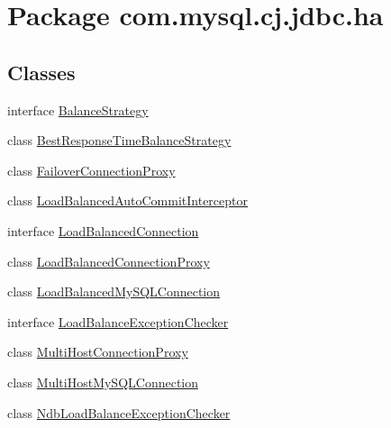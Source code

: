 \hypertarget{namespacecom_1_1mysql_1_1cj_1_1jdbc_1_1ha}{}\section{Package com.\+mysql.\+cj.\+jdbc.\+ha}
\label{namespacecom_1_1mysql_1_1cj_1_1jdbc_1_1ha}
\subsection*{Classes}
\begin{DoxyCompactItemize}
\item 
interface \mbox{\hyperlink{interfacecom_1_1mysql_1_1cj_1_1jdbc_1_1ha_1_1_balance_strategy}{Balance\+Strategy}}
\item 
class \mbox{\hyperlink{classcom_1_1mysql_1_1cj_1_1jdbc_1_1ha_1_1_best_response_time_balance_strategy}{Best\+Response\+Time\+Balance\+Strategy}}
\item 
class \mbox{\hyperlink{classcom_1_1mysql_1_1cj_1_1jdbc_1_1ha_1_1_failover_connection_proxy}{Failover\+Connection\+Proxy}}
\item 
class \mbox{\hyperlink{classcom_1_1mysql_1_1cj_1_1jdbc_1_1ha_1_1_load_balanced_auto_commit_interceptor}{Load\+Balanced\+Auto\+Commit\+Interceptor}}
\item 
interface \mbox{\hyperlink{interfacecom_1_1mysql_1_1cj_1_1jdbc_1_1ha_1_1_load_balanced_connection}{Load\+Balanced\+Connection}}
\item 
class \mbox{\hyperlink{classcom_1_1mysql_1_1cj_1_1jdbc_1_1ha_1_1_load_balanced_connection_proxy}{Load\+Balanced\+Connection\+Proxy}}
\item 
class \mbox{\hyperlink{classcom_1_1mysql_1_1cj_1_1jdbc_1_1ha_1_1_load_balanced_my_s_q_l_connection}{Load\+Balanced\+My\+S\+Q\+L\+Connection}}
\item 
interface \mbox{\hyperlink{interfacecom_1_1mysql_1_1cj_1_1jdbc_1_1ha_1_1_load_balance_exception_checker}{Load\+Balance\+Exception\+Checker}}
\item 
class \mbox{\hyperlink{classcom_1_1mysql_1_1cj_1_1jdbc_1_1ha_1_1_multi_host_connection_proxy}{Multi\+Host\+Connection\+Proxy}}
\item 
class \mbox{\hyperlink{classcom_1_1mysql_1_1cj_1_1jdbc_1_1ha_1_1_multi_host_my_s_q_l_connection}{Multi\+Host\+My\+S\+Q\+L\+Connection}}
\item 
class \mbox{\hyperlink{classcom_1_1mysql_1_1cj_1_1jdbc_1_1ha_1_1_ndb_load_balance_exception_checker}{Ndb\+Load\+Balance\+Exception\+Checker}}

\end{DoxyCompactItemize}
